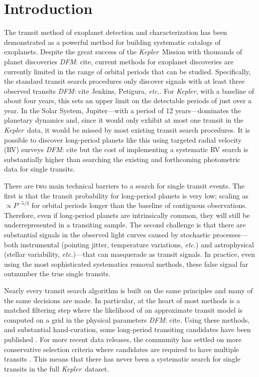 \documentclass[12pt,preprint]{aastex}
\newcommand{\project}[1]{\textsl{#1}}
\newcommand{\kepler}{\project{Kepler}}
\newcommand{\foreign}[1]{\emph{#1}}
\newcommand{\etc}{\foreign{etc.}}
\newcommand{\todo}[3]{{\color{#2}\emph{#1}: #3}}
\newcommand{\dfmtodo}[1]{\todo{DFM}{red}{#1}}
\newcommand{\period}{{\ensuremath{P}}}
\begin{document}

\section{Introduction}

The transit method of exoplanet detection and characterization has been
demonstrated as a powerful method for building systematic catalogs of
exoplanets.
Despite the great success of the \kepler\ Mission with thousands of planet
discoveries \dfmtodo{cite}, current methods for exoplanet discoveries are
currently limited in the range of orbital periods that can be studied.
Specifically, the standard transit search procedures only discover signals
with at least three observed transits \dfmtodo{cite Jenkins, Petigura, \etc}.
For \kepler, with a baseline of about four years, this sets an upper limit on
the detectable periods of just over a year.
In the Solar System, Jupiter---with a period of 12 years---dominates the
planetary dynamics and, since it would only exhibit at most one transit in the
\kepler\ data, it would be missed by most existing transit search procedures.
It is possible to discover long-period planets like this using targeted radial
velocity (RV) surveys \dfmtodo{cite} but the cost of implementing a systematic
RV search is substantially higher than searching the existing and forthcoming
photometric data for single transits.

There are two main technical barriers to a search for single transit events.
The first is that the transit probability for long-period planets is very low;
scaling as $\propto\period^{-5/3}$ for orbital periods longer than the
baseline of contiguous observations.
Therefore, even if long-period planets are intrinsically common, they will
still be underrepresented in a transiting sample.
The second challenge is that there are substantial signals in the observed
light curves caused by stochastic processes---both instrumental
(pointing jitter, temperature variations, \etc) and astrophysical (stellar
variability, \etc)---that can masquerade as transit signals.
In practice, even using the most sophisticated systematics removal methods,
these false signal far outnumber the true single transits.

Nearly every transit search algorithm is built on the same principles and many
of the same decisions are made.
In particular, at the heart of most methods is a matched filtering step where
the likelihood of an approximate transit model is computed on a grid in the
physical parameters \dfmtodo{cite}.
Using these methods, and substantial hand-curation, some long-period
transiting candidates have been published \citep[for example][]{Batalha:2013,
Huang:2013, Kipping:2014a}.
For more recent data releases, the community has settled on more conservative
selection criteria where candidates are required to have multiple transits
\citep[for example][]{Petigura:2013, Burke:2014}.
This means that there has never been a systematic search for single transits
in the full \kepler\ dataset.
\end{document}
